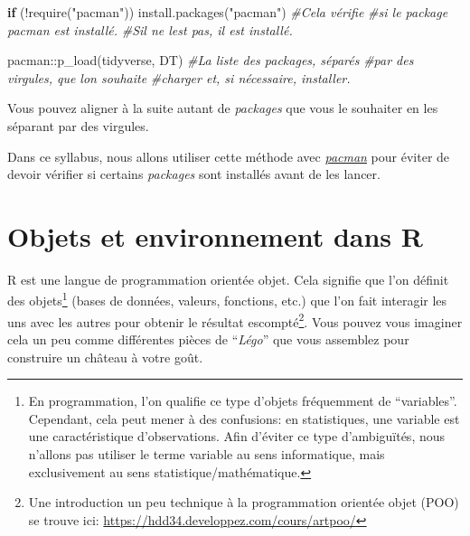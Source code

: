 \documentclass[
]{book}
\newenvironment{Shaded}{\begin{snugshade}}{\end{snugshade}}
\newcommand{\CommentTok}[1]{\textcolor[rgb]{0.56,0.35,0.01}{\textit{#1}}}
\newcommand{\ControlFlowTok}[1]{\textcolor[rgb]{0.13,0.29,0.53}{\textbf{#1}}}
\newcommand{\FunctionTok}[1]{\textcolor[rgb]{0.00,0.00,0.00}{#1}}
\newcommand{\NormalTok}[1]{#1}
\newcommand{\SpecialCharTok}[1]{\textcolor[rgb]{0.00,0.00,0.00}{#1}}
\newcommand{\StringTok}[1]{\textcolor[rgb]{0.31,0.60,0.02}{#1}}
\begin{document}
\begin{Shaded}
\begin{Highlighting}[]
\ControlFlowTok{if}\NormalTok{ (}\SpecialCharTok{!}\FunctionTok{require}\NormalTok{(}\StringTok{"pacman"}\NormalTok{)) }\FunctionTok{install.packages}\NormalTok{(}\StringTok{"pacman"}\NormalTok{) }\CommentTok{\#Cela vérifie}
                             \CommentTok{\#si le package pacman est installé.}
                             \CommentTok{\#S\textquotesingle{}il ne l\textquotesingle{}est pas, il est installé.}

\NormalTok{pacman}\SpecialCharTok{::}\FunctionTok{p\_load}\NormalTok{(tidyverse, DT) }\CommentTok{\#La liste des packages, séparés}
                      \CommentTok{\#par des virgules, que l\textquotesingle{}on souhaite}
                      \CommentTok{\#charger et, si nécessaire, installer.}
\end{Highlighting}
\end{Shaded}

Vous pouvez aligner à la suite autant de \emph{packages} que vous le souhaiter en les séparant par des virgules.

Dans ce syllabus, nous allons utiliser cette méthode avec \href{http://trinker.github.io/pacman/vignettes/Introduction_to_pacman.html}{\emph{pacman}} pour éviter de devoir vérifier si certains \emph{packages} sont installés avant de les lancer.

\hypertarget{objets_envir}{%
\section{Objets et environnement dans R}\label{objets_envir}}

R est une langue de programmation orientée objet. Cela signifie que l'on définit des objets\footnote{En programmation, l'on qualifie ce type d'objets fréquemment de ``variables''. Cependant, cela peut mener à des confusions: en statistiques, une variable est une caractéristique d'observations. Afin d'éviter ce type d'ambiguïtés, nous n'allons pas utiliser le terme variable au sens informatique, mais exclusivement au sens statistique/mathématique.} (bases de données, valeurs, fonctions, etc.) que l'on fait interagir les uns avec les autres pour obtenir le résultat escompté\footnote{Une introduction un peu technique à la programmation orientée objet (POO) se trouve ici: \url{https://hdd34.developpez.com/cours/artpoo/}}. Vous pouvez vous imaginer cela un peu comme différentes pièces de ``\emph{Légo}'' que vous assemblez pour construire un château à votre goût.
\end{document}
